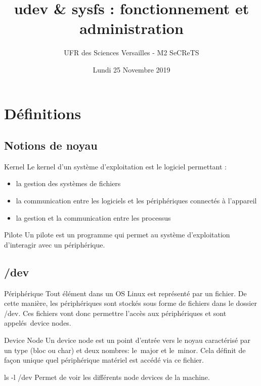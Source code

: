 \documentclass{beamer}
\title{udev \& sysfs : fonctionnement et administration}
\author{UFR des Sciences Versailles - M2 SeCReTS}
\institute{CAUMES Clément \& DEBROUASSE Kevin \& \\ HEQUET Jonathan \& Mehdi MTALSI-MERIMI}
\date{Lundi 25 Novembre 2019}
\begin{document}
  \begin{frame}
  \titlepage
  \end{frame}

\section{Définitions}

\subsection{Notions de noyau}

 \begin{frame}
	\begin{block}{Kernel} 
	Le kernel d'un système d'exploitation est le logiciel permettant : 
	\begin{itemize}
		[circle]
		\item la gestion des systèmes de fichiers
		\item la communication entre les logiciels et les périphériques connectés à l'appareil
		\item la gestion et la communication entre les processus
	\end{itemize}
	\end{block}

	\begin{block}{Pilote} 
		Un pilote est un programme qui permet au système d'exploitation d'interagir avec un périphérique.
	\end{block}


\end{frame}

\subsection{/dev}
 \begin{frame}
	\begin{block}{Périphérique} 
		Tout élément dans un OS Linux est représenté par un fichier. De cette manière, les périphériques sont stockés sous forme de fichiers dans le dossier /dev.
		Ces fichiers vont donc permettre l’accès aux périphériques et sont appelés device nodes. 
	\end{block}
    \begin{block}{Device Node}
    	Un device node est un point d’entrée vers le noyau caractérisé par un type (bloc ou char) et deux nombres: le major et le minor. Cela définit de façon unique quel périphérique matériel est accédé via ce fichier. 
    \end{block}
	\begin{exampleblock}{ls -l /dev} 
		 Permet de voir les différents node devices de la machine.
	\end{exampleblock}
\end{frame}
\end{document}
